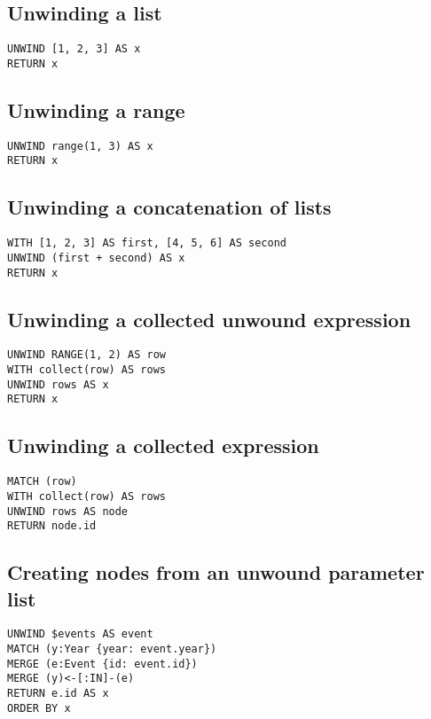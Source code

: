 \subsection{Unwinding a list}

\begin{lstlisting}
UNWIND [1, 2, 3] AS x
RETURN x
\end{lstlisting}

\subsection{Unwinding a range}

\begin{lstlisting}
UNWIND range(1, 3) AS x
RETURN x
\end{lstlisting}

\subsection{Unwinding a concatenation of lists}

\begin{lstlisting}
WITH [1, 2, 3] AS first, [4, 5, 6] AS second
UNWIND (first + second) AS x
RETURN x
\end{lstlisting}

\subsection{Unwinding a collected unwound expression}

\begin{lstlisting}
UNWIND RANGE(1, 2) AS row
WITH collect(row) AS rows
UNWIND rows AS x
RETURN x
\end{lstlisting}

\subsection{Unwinding a collected expression}

\begin{lstlisting}
MATCH (row)
WITH collect(row) AS rows
UNWIND rows AS node
RETURN node.id
\end{lstlisting}

\subsection{Creating nodes from an unwound parameter list}

\begin{lstlisting}
UNWIND $events AS event
MATCH (y:Year {year: event.year})
MERGE (e:Event {id: event.id})
MERGE (y)<-[:IN]-(e)
RETURN e.id AS x
ORDER BY x
\end{lstlisting}

